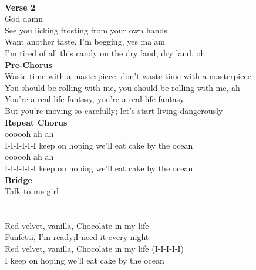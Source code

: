    \\
\textbf{Verse 2}\\
God damn\\
See you licking frosting from your own hands\\
Want another taste, I'm begging, yes ma'am\\
I'm tired of all this candy on the dry land, dry land, oh\\
\textbf{Pre-Chorus}\\
Waste time with a masterpiece, don't waste time with a masterpiece\\
You should be rolling with me, you should be rolling with me, ah\\
You're a real-life fantasy, you're a real-life fantasy\\       
But you're moving so carefully; let's start living dangerously\\
\textbf{Repeat Chorus}\\
oooooh ah ah\\
I-I-I-I-I-I keep on hoping we'll eat cake by the ocean\\
oooooh ah ah\\
I-I-I-I-I-I keep on hoping we'll eat cake by the ocean\\
\textbf{Bridge}\\
 Talk to me girl\\
\textbf{}\\
\textbf{}\\
 Red velvet, vanilla, Chocolate in my life\\
Funfetti, I'm ready;I need it every night\\
 Red velvet, vanilla, Chocolate in my life (I-I-I-I-I)\\
I keep on hoping we'll eat cake by the ocean\\
